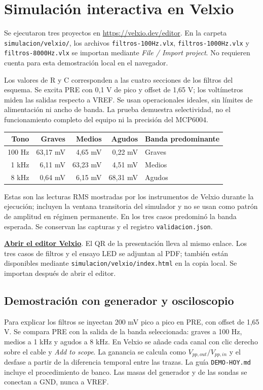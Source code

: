 \section{Simulación interactiva en Velxio}
Se ejecutaron tres proyectos en \url{https://velxio.dev/editor}. En la carpeta \texttt{simulacion/velxio/}, los archivos \texttt{filtros-100Hz.vlx}, \texttt{filtros-1000Hz.vlx} y \texttt{filtros-8000Hz.vlx} se importan mediante \emph{File / Import project}. No requieren cuenta para esta demostración local en el navegador.

Los valores de R y C corresponden a las cuatro secciones de los filtros del esquema. Se excita PRE con 0,1 V de pico y offset de 1,65 V; los voltímetros miden las salidas respecto a VREF. Se usan operacionales ideales, sin límites de alimentación ni ancho de banda. La prueba demuestra selectividad, no el funcionamiento completo del equipo ni la precisión del MCP6004.
\begin{center}\begin{tabular}{rrrrl}\toprule
Tono & Graves & Medios & Agudos & Banda predominante\\\midrule
100 Hz & 63,17 mV & 4,65 mV & 0,22 mV & Graves\\
1 kHz & 6,11 mV & 63,23 mV & 4,51 mV & Medios\\
8 kHz & 0,64 mV & 6,15 mV & 68,31 mV & Agudos\\\bottomrule\end{tabular}\end{center}
Estas son las lecturas RMS mostradas por los instrumentos de Velxio durante la ejecución; incluyen la ventana transitoria del simulador y no se usan como patrón de amplitud en régimen permanente. En los tres casos predominó la banda esperada. Se conservan las capturas y el registro \texttt{validacion.json}.

\noindent\href{https://velxio.dev/editor/}{\textbf{Abrir el editor Velxio}}. El QR de la presentación lleva al mismo enlace. Los tres casos de filtros y el ensayo LED se adjuntan al PDF; también están disponibles mediante \texttt{simulacion/velxio/index.html} en la copia local. Se importan después de abrir el editor.

\subsection{Demostración con generador y osciloscopio}
Para explicar los filtros se inyectan 200 mV pico a pico en PRE, con offset de 1,65 V. Se compara PRE con la salida de la banda seleccionada: graves a 100 Hz, medios a 1 kHz y agudos a 8 kHz. En Velxio se añade cada canal con clic derecho sobre el cable y \emph{Add to scope}. La ganancia se calcula como $V_{pp,out}/V_{pp,in}$ y el desfase a partir de la diferencia temporal entre las trazas. La guía \texttt{DEMO-HOY.md} incluye el procedimiento de banco. Las masas del generador y de las sondas se conectan a GND, nunca a VREF.


